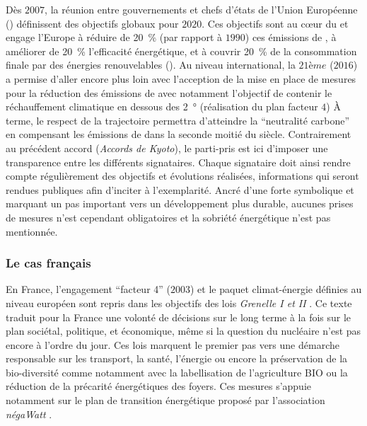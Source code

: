 Dès $2007$, la réunion entre gouvernements et chefs d’états de l’Union Européenne
() définissent des objectifs globaux pour $2020$. Ces objectifs sont au cœur du
 et engage l’Europe à réduire de \SI{20}{\percent} (par rapport à $1990$) ces
émissions de , à améliorer de \SI{20}{\percent} l’efficacité énergétique, et à
couvrir \SI{20}{\percent} de la consommation finale par des énergies renouvelables
(). Au niveau international, la $21ème$  ($2016$) a permise d’aller
encore plus loin avec l’acception de la mise en place de mesures pour la réduction des
émissions de  avec notamment l’objectif de contenir le réchauffement climatique
en dessous des \SI{2}{\degree} (réalisation du plan facteur $4$) À terme, le respect de la trajectoire
permettra d’atteindre la \enquote{neutralité carbone} en compensant les émissions de
 dans la seconde moitié du siècle. Contrairement au précédent accord
(\textit{Accords de Kyoto}), le parti-pris est ici d’imposer une transparence entre les
différents signataires. Chaque signataire doit ainsi rendre compte régulièrement des
objectifs et évolutions réalisées, informations qui seront rendues publiques afin
d’inciter à l’exemplarité. Ancré d’une forte symbolique et marquant un pas important vers
un développement plus durable, aucunes prises de mesures n’est cependant obligatoires et
la sobriété énergétique n’est pas mentionnée.


\subsubsection{Le cas français} %
\label{ssub:le_cas_francais}
En France, l’engagement \enquote{facteur 4} ($2003$) et le paquet climat-énergie définies
au niveau européen sont repris dans les objectifs des lois \textit{Grenelle I et II}
\parencite{Grenelle2010}. Ce texte traduit pour la France une volonté de décisions sur le
long terme à la fois sur le plan sociétal, politique, et économique, même si la question
du nucléaire n’est pas encore à l’ordre du jour. Ces lois marquent le premier pas vers une
démarche responsable sur les transport, la santé, l’énergie ou encore la préservation de
la bio-diversité comme notamment avec la labellisation de l’agriculture BIO ou la
réduction de la précarité énergétiques des foyers. Ces mesures s’appuie notamment sur le
plan de transition énergétique proposé par l’association \textit{négaWatt}
\parencite{Salomon2012}.

